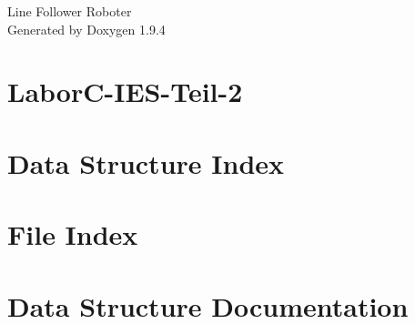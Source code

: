\documentclass[twoside]{book}
\newcommand{\+}{\discretionary{\mbox{\scriptsize$\hookleftarrow$}}{}{}}
\newcommand{\clearemptydoublepage}{%
    \newpage{\pagestyle{empty}\cleardoublepage}%
  }
\begin{document}
  \raggedbottom
    \hypersetup{pageanchor=false,
                bookmarksnumbered=true,
                pdfencoding=unicode
               }
  \begin{titlepage}
  \vspace*{7cm}
  \begin{center}%
  {\Large Line Follower Roboter}\\
  \vspace*{1cm}
  {\large Generated by Doxygen 1.9.4}\\
  \end{center}
  \end{titlepage}
  \clearemptydoublepage
  \tableofcontents
  \clearemptydoublepage
  \hypersetup{pageanchor=true}
\chapter{Labor\+C-\/\+IES-\/\+Teil-\/2}
\label{index}\hypertarget{index}{}
\chapter{Data Structure Index}

\chapter{File Index}

\chapter{Data Structure Documentation}





\end{document}
